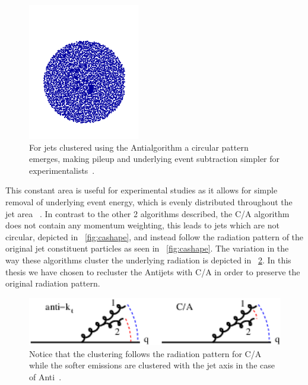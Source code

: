 \begin{figure}[htb]
\centering
\includegraphics[width=.40\textwidth]{visuals/figs_subjet-plots-antikt.png}
\caption{For jets clustered using the Anti\kt algorithm a circular pattern emerges, making pileup and underlying event subtraction simpler for experimentalists~\cite{Dreyer:2018nbf}.}
\label{fig:antikt}
\end{figure}



This constant area is useful for experimental studies as it allows for simple removal of underlying event energy, which is evenly distributed throughout the jet area ~\cite{Dreyer:2018nbf}. In contrast to the other 2 algorithms described, the C/A algorithm does not contain any momentum weighting, this leads to jets which are not circular, depicted in ~\ref{fig:cashape}, and instead follow the radiation pattern of the original jet constituent particles as seen in ~\ref{fig:cashape}. The variation in the way these algorithms cluster the underlying radiation is depicted in ~\ref{fig:algclusterdiffs}. In this thesis we have chosen to recluster the Anti\kt jets with C/A in order to preserve the original radiation pattern.


\begin{figure}[htb]
\centering
\includegraphics[width=1.0\textwidth]{visuals/config-antikt-double-lund.png}
\caption{Notice that the clustering follows the radiation pattern for C/A while the softer emissions are clustered with the jet axis in the case of Anti\kt ~\cite{Dreyer:2018nbf}.}
\label{fig:algclusterdiffs}
\end{figure}


